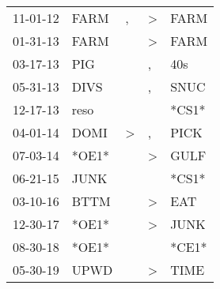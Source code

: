 \begin{supertabular}{p{0.07\textwidth}p{0.06\textwidth}p{0.02\textwidth}p{0.02\textwidth}p{0.06\textwidth}}
          11-01-12\textsuperscript{} &           FARM\textsuperscript{} &             , &     \textgreater &  FARM\textsuperscript{} \\
          01-31-13\textsuperscript{} &           FARM\textsuperscript{} &               &     \textgreater &  FARM\textsuperscript{} \\
          03-17-13\textsuperscript{} &            PIG\textsuperscript{} &               &                , &   40s\textsuperscript{} \\
          05-31-13\textsuperscript{} &           DIVS\textsuperscript{} &               &                , &  SNUC\textsuperscript{} \\
          12-17-13\textsuperscript{} &           reso\textsuperscript{} &               &                  &                   *CS1* \\
          04-01-14\textsuperscript{} &           DOMI\textsuperscript{} &  \textgreater &                , &  PICK\textsuperscript{} \\
          07-03-14\textsuperscript{} &                            *OE1* &               &     \textgreater &  GULF\textsuperscript{} \\
          06-21-15\textsuperscript{} &           JUNK\textsuperscript{} &               &                  &                   *CS1* \\
          03-10-16\textsuperscript{} &           BTTM\textsuperscript{} &               &     \textgreater &   EAT\textsuperscript{} \\
          12-30-17\textsuperscript{} &                            *OE1* &               &     \textgreater &  JUNK\textsuperscript{} \\
          08-30-18\textsuperscript{} &                            *OE1* &               &                  &                   *CE1* \\
          05-30-19\textsuperscript{} &           UPWD\textsuperscript{} &               &     \textgreater &  TIME\textsuperscript{} \\
\end{supertabular}
